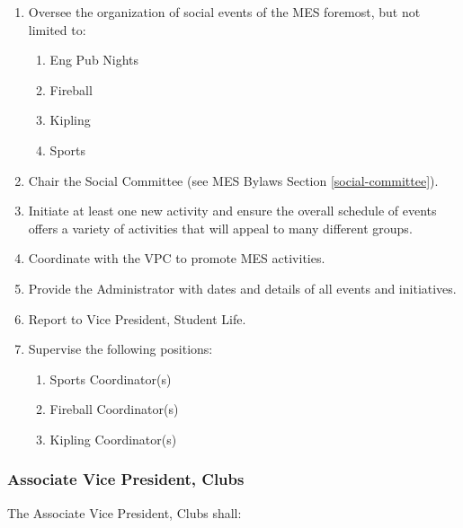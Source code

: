 \begin{enumerate}
\item
 Oversee the organization of social events of the MES foremost, but not
 limited to:

 \begin{enumerate}
  \item
   Eng Pub Nights
  \item
   Fireball
  \item
   Kipling
  \item
   Sports
 \end{enumerate}
\item
 Chair the Social Committee (see MES Bylaws Section \ref{social-committee}).
\item
 Initiate at least one new activity and ensure the overall schedule of
 events offers a variety of activities that will appeal to many
 different groups.
\item
 Coordinate with the VPC to promote MES activities.
\item
 Provide the Administrator with dates and details of all events and
 initiatives.
\item
 Report to Vice President, Student Life.
\item
 Supervise the following positions:

 \begin{enumerate}
  \item
   Sports Coordinator(s)
  \item
   Fireball Coordinator(s)
  \item
   Kipling Coordinator(s)

 \end{enumerate}
\end{enumerate}

\subsubsection{Associate Vice President, Clubs}
\label{associate-vice-president-clubs}
The Associate Vice President, Clubs shall:

